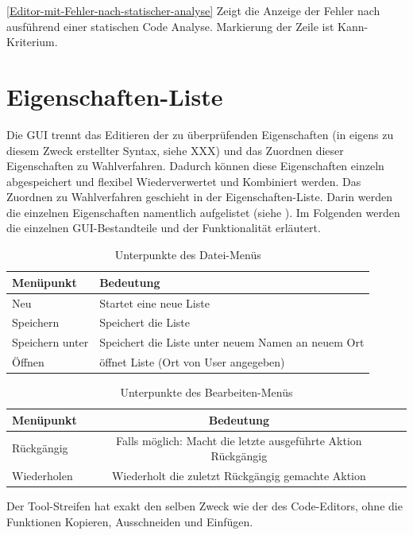 \documentclass[a4paper]{scrreprt}
\begin{document}
\ref{Editor-mit-Fehler-nach-statischer-analyse} Zeigt die Anzeige der Fehler nach ausführend einer statischen Code Analyse. Markierung der Zeile ist Kann-Kriterium.

\section{Eigenschaften-Liste}
Die GUI trennt das Editieren der zu überprüfenden Eigenschaften (in eigens zu diesem Zweck erstellter Syntax, siehe XXX) und das Zuordnen dieser Eigenschaften zu Wahlverfahren. Dadurch können diese Eigenschaften einzeln abgespeichert und flexibel Wiederverwertet und Kombiniert werden. Das Zuordnen zu Wahlverfahren geschieht in der Eigenschaften-Liste. Darin werden die einzelnen Eigenschaften namentlich aufgelistet (siehe ). Im Folgenden werden die einzelnen \ac{GUI}-Bestandteile und der Funktionalität erläutert.

\begin{table}[H]
\begin{tabular}{|p{3cm}|p{12cm}|}
Menüpunkt & Bedeutung \\
\hline
Neu & Startet eine neue Liste \\
Speichern & Speichert die Liste \\
Speichern unter & Speichert die Liste unter neuem Namen an neuem Ort \\
Öffnen & öffnet Liste (Ort von User angegeben)
\end{tabular}
\label{Eigenschaftenliste-Datei-Menüpunkte}
\caption{Unterpunkte des Datei-Menüs}
\end{table}

\begin{table}[H]
\begin{tabular}{lcr} 
Menüpunkt & Bedeutung \\
\hline
Rückgängig & Falls möglich: Macht die letzte ausgeführte Aktion Rückgängig \\
Wiederholen & Wiederholt die zuletzt Rückgängig gemachte Aktion 
\end{tabular}
\label{Eigenschaftenliste-Bearbeiten-Menüpunkte}
\caption{Unterpunkte des Bearbeiten-Menüs}
\end{table}

Der Tool-Streifen hat exakt den selben Zweck wie der des Code-Editors, ohne die Funktionen Kopieren, Ausschneiden und Einfügen.
\end{document}
